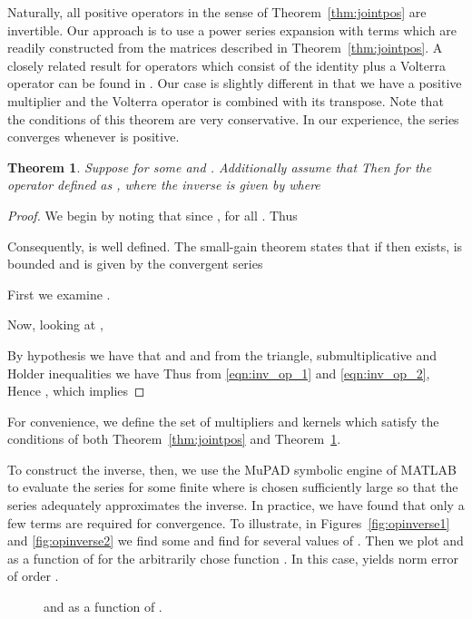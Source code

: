 \documentclass[9pt,journal,twocolumn]{IEEEtran}
\newtheorem{theorem}{Theorem}
\begin{document}
Naturally, all positive operators in the sense of Theorem~\ref{thm:jointpos} are invertible. Our approach is to use a power series expansion with terms which are readily constructed from the matrices described in Theorem~\ref{thm:jointpos}. A closely related result for operators which consist of the identity plus a Volterra operator can be found in \cite[Sec 1.99]{shilov1974elementary}. Our case is slightly different in that we have a positive multiplier  and the Volterra operator is combined with its transpose. Note that the conditions of this theorem are very conservative. In our experience, the series converges whenever  is positive.


\begin{theorem}\label{thm:inv_op}
Suppose  for some  and . Additionally assume that
 Then for the operator  defined as , where
 the inverse is given by
 where

\end{theorem}
\begin{proof}
We begin by noting that since ,  for all . Thus

Consequently,
 is well defined. The small-gain theorem states that  if  then  exists, is bounded and is given by the convergent series

First we examine .

Now, looking at ,

By hypothesis we have that  and  and from the triangle, submultiplicative and Holder inequalities we have
 Thus from \eqref{eqn:inv_op_1} and \eqref{eqn:inv_op_2},
 Hence , which implies

\end{proof}

For convenience, we define the set of multipliers and kernels which satisfy the conditions of both Theorem~\ref{thm:jointpos} and Theorem~\ref{thm:inv_op}.


To construct the inverse, then, we use the MuPAD symbolic engine of MATLAB to evaluate the series  for some finite  where  is chosen sufficiently large so that the series adequately approximates the inverse. In practice, we have found that only a few terms are required for convergence. To illustrate, in Figures~\ref{fig:opinverse1} and \ref{fig:opinverse2} we find some  and find 
for several values of . Then we plot  and  as a function of  for the arbitrarily chose function . In this case,  yields norm error of order .

\begin{figure}[ht]
\centering
{}
\quad
{}
\caption{ and   as a function of .}
\end{figure}
\end{document}
